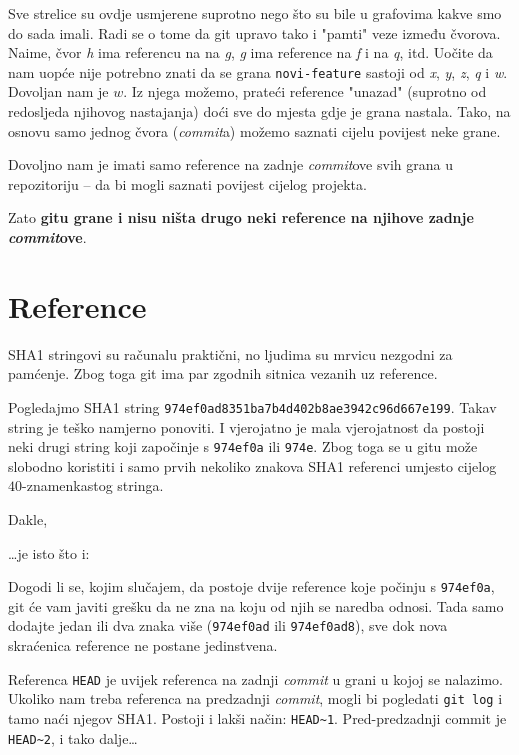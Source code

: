 Sve strelice su ovdje usmjerene suprotno nego što su bile u grafovima kakve smo do sada imali.
Radi se o tome da git upravo tako i "pamti" veze između čvorova.
Naime, čvor \emph h ima referencu na na \emph g, \emph g ima reference na \emph f i na \emph q, itd.
Uočite da nam uopće nije potrebno znati da se grana \verb+novi-feature+ sastoji od \emph x, \emph y, \emph z, \emph q i \emph w.
Dovoljan nam je $w$.
Iz njega možemo, prateći reference "unazad" (suprotno od redosljeda njihovog nastajanja) doći sve do mjesta gdje je grana nastala.
Tako, na osnovu samo jednog čvora (\emph{commit}a) možemo saznati cijelu povijest neke grane.

Dovoljno nam je imati samo reference na zadnje \emph{commit}ove svih grana u repozitoriju -- da bi mogli saznati povijest cijelog projekta.

Zato \textbf{gitu grane i nisu ništa drugo neki reference na njihove zadnje \emph{commit}ove}.

\section*{Reference}

SHA1 stringovi su računalu praktični, no ljudima su mrvicu nezgodni za pamćenje.
Zbog toga git ima par zgodnih sitnica vezanih uz reference.

Pogledajmo SHA1 string \verb+974ef0ad8351ba7b4d402b8ae3942c96d667e199+.
Takav string je teško namjerno ponoviti. I vjerojatno je mala vjerojatnost da postoji neki drugi string koji započinje s \verb+974ef0a+ ili \verb+974e+.
Zbog toga se u gitu može slobodno koristiti i samo prvih nekoliko znakova SHA1 referenci umjesto cijelog $40$-znamenkastog stringa.

Dakle, 


\dots{}je isto što i:


Dogodi li se, kojim slučajem, da postoje dvije reference koje počinju s \verb+974ef0a+, git će vam javiti grešku da ne zna na koju od njih se naredba odnosi.
Tada samo dodajte jedan ili dva znaka više (\verb+974ef0ad+ ili \verb+974ef0ad8+), sve dok nova skraćenica reference ne postane jedinstvena.

Referenca \verb+HEAD+ je uvijek referenca na zadnji \emph{commit} u grani u kojoj se nalazimo.
Ukoliko nam treba referenca na predzadnji \emph{commit}, mogli bi pogledati \verb+git log+ i tamo naći njegov SHA1.
Postoji i lakši način: \verb+HEAD~1+.
Pred-predzadnji commit je \verb+HEAD~2+, i tako dalje\dots

